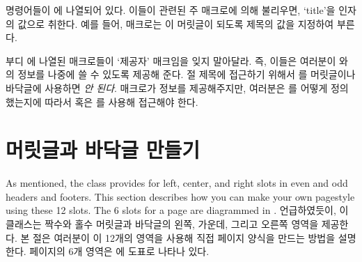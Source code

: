  명령어들이 에 나열되어 있다. 이들이 관련된 주
매크로에 의해 불리우면, `title'을 인자의 값으로 취한다.
예를 들어, \cmd{\chapter} 매크로는 \cmd{\chaptermark}이 머릿글이 되도록 제목의
값을 지정하여 부른다.

부디 에 나열된 매크로들이 `제공자' 매크임을 잊지 말아달라.
즉, 이들은 여러분이 \cmd{\leftmark}와 \cmd{\rightmark}의 정보를 나중에 쓸 수
있도록 제공해 준다.
절 제목에 접근하기 위해서 \cmd{\sectionmark}를 머릿글이나 바닥글에 사용하면
\emph{안 된다}.
매크로가 정보를 제공해주지만, 여러분은 \cmd{\sectionmark}를 어떻게 정의했는지에
따라서 \cmd{\leftmark} 혹은 \cmd{\rightmark}를 사용해 접근해야 한다.


\section{머릿글과 바닥글 만들기}

    As mentioned, the class provides for left, center, and right slots in
even and odd headers and footers. 
This section describes how you can make 
your own pagestyle using these 12 slots. The 6 slots for a page 
are diagrammed in .
언급하였듯이, 이 클래스는 짝수와 홀수 머릿글과
바닥글의 왼쪽, 가운데, 그리고 오른쪽 영역을 제공한다.
본 절은 여러분이 이 12개의 영역을 사용해 직접 페이지 양식을 만드는 방법을
설명한다.
페이지의 6개 영역은 에 도표로 나타나 있다.

